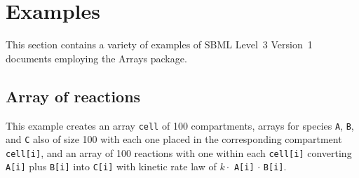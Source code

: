 %
\section{Examples}
\label{examples}

This section contains a variety of examples of SBML Level~3 Version~1
documents employing the Arrays package.

\subsection{Array of reactions}

This example creates an array {\tt cell} of 100 compartments, arrays for species {\tt A}, {\tt B}, and {\tt C} also of size 100 with each one placed in the corresponding compartment {\tt cell[i]}, and an array of 100 reactions with one within each {\tt cell[i]} converting {\tt A[i]} plus {\tt B[i]} into {\tt C[i]} with kinetic rate law of $k \cdot$ {\tt A[i]} $\cdot$ {\tt B[i]}.

